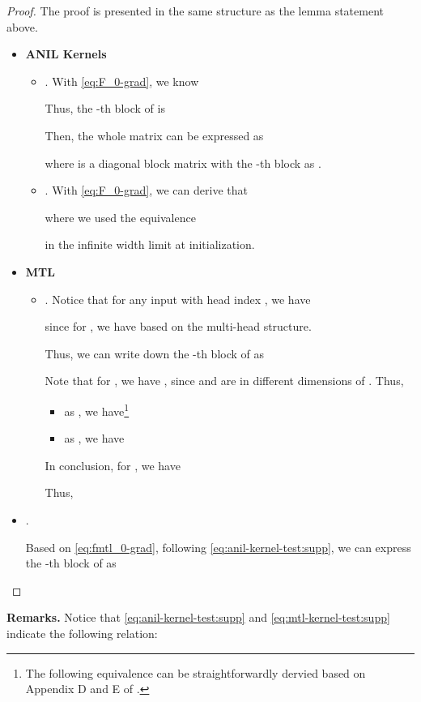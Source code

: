 \documentclass{article}
\begin{document}
\begin{proof} The proof is presented in the same structure as the lemma statement above.
\begin{itemize}[leftmargin=*,align=left,noitemsep,nolistsep]
    \item \textbf{ANIL Kernels}
    \begin{itemize}[leftmargin=*,align=left,noitemsep,nolistsep]
        \item . With \eqref{eq:F_0-grad}, we know
        
        Thus, the -th block of  is
        
        Then, the whole matrix can be expressed as
        
        where  is a diagonal block matrix with the -th block as .
        \item . With \eqref{eq:F_0-grad}, we can derive that 
        
        where we used the equivalence 
        
        in the infinite width limit at initialization.
\end{itemize}
    \item \textbf{MTL}
    \begin{itemize}[leftmargin=*,align=left,noitemsep,nolistsep]
        \item . Notice that for any input with head index , we have
        
        since for , we have  based on the multi-head structure.
        
        Thus, we can write down the -th block of  as
        
        Note that for , we have , since  and  are in different dimensions of . Thus,
        \begin{itemize}
            \item as , we have\footnote{The following equivalence can be straightforwardly dervied based on Appendix D and E of \cite{lee2019wide}.}
        
            \item as , we have
            
        \end{itemize}
        In conclusion, for , we have
        
        Thus, 
        

    \end{itemize}
    \item . 


    Based on \eqref{eq:fmtl_0-grad}, following \eqref{eq:anil-kernel-test:supp}, we can express the -th block of  as
    
\end{itemize}
\end{proof}
\textbf{Remarks.} Notice that \eqref{eq:anil-kernel-test:supp} and \eqref{eq:mtl-kernel-test:supp} indicate the following relation:
    
\end{document}
